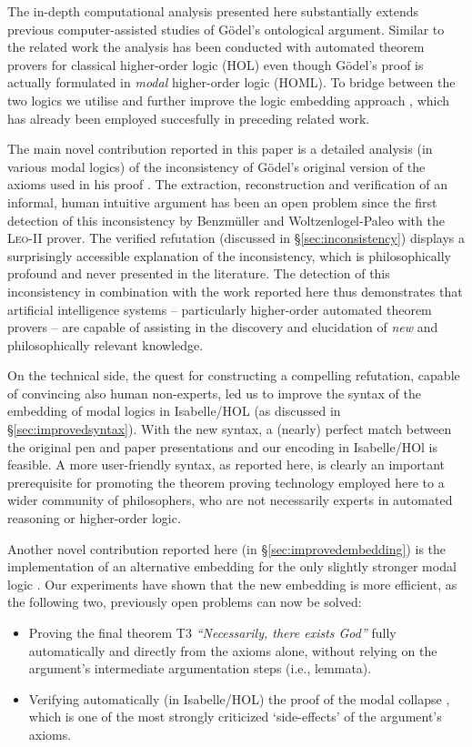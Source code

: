 \documentclass{article}
\begin{document}
The in-depth computational analysis presented here substantially
extends previous computer-assisted studies of G\"odel's ontological
argument. Similar to the related work \cite{J30,C40} the analysis has
been conducted with automated theorem provers for classical
higher-order logic (HOL) even though G\"odel's proof is actually
formulated in \emph{modal} higher-order logic (HOML). To bridge between the two
logics we utilise and further improve the logic embedding
approach \cite{J23,C40}, which has already been employed succesfully in preceding related work.


The main novel contribution reported in this paper is a detailed analysis (in various modal logics) 
of the inconsistency of G\"{o}del's original version of the axioms used in his proof 
. The extraction, reconstruction and verification of an informal, 
human intuitive argument has been an open problem since the first detection of this inconsistency 
by Benzm\"uller and Woltzenlogel-Paleo  with the \textsc{Leo-II} prover. 
The verified refutation (discussed in \S\ref{sec:inconsistency}) displays a surprisingly accessible
explanation of the inconsistency, which is philosophically
profound and never presented in the
literature. The detection of this inconsistency in combination with
the work reported here thus demonstrates that artificial intelligence systems 
-- particularly higher-order automated theorem provers -- 
are capable of assisting in the discovery and elucidation of
\emph{new} and philosophically relevant knowledge. 

On the technical side, the quest for constructing a compelling refutation, 
capable of convincing also human non-experts, led us to improve the 
syntax of the embedding of modal logics in
Isabelle/HOL (as discussed in \S\ref{sec:improvedsyntax}). With the new
syntax, a (nearly) perfect match
between the original pen and paper presentations and our encoding in
Isabelle/HOl is feasible. A more user-friendly syntax, as reported here, is clearly an important prerequisite
for promoting the theorem proving technology employed here to a wider community of
philosophers, who are not necessarily experts in automated reasoning or higher-order logic.

Another novel contribution reported here (in \S\ref{sec:improvedembedding}) is
the implementation of an alternative embedding for the only slightly
stronger modal logic \SFiveU. Our experiments have shown that the new
embedding is more efficient, as the following two, previously open problems can now be solved:
\begin{itemize}
\item Proving the final theorem T3 \textit{``Necessarily, there
    exists God''} fully automatically and directly from the axioms
  alone, without relying on the argument's intermediate argumentation
  steps (i.e., lemmata).
\item Verifying automatically (in Isabelle/HOL) the proof of the modal
  collapse \cite{Sobel}, which is one of the most strongly criticized
  `side-effects' of the argument's axioms.
\end{itemize}
\end{document}
